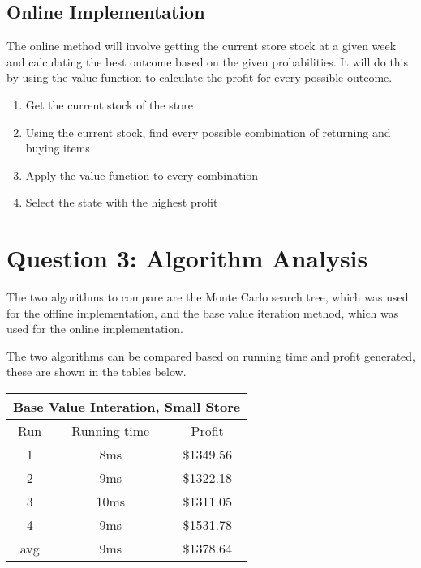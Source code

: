 \documentclass[12pt]{article}
\begin{document}
    \subsection{Online Implementation}

    The online method will involve getting the current store stock at a given week and calculating the best outcome based on the given probabilities. It will do this by using the value function to calculate the profit for every possible outcome.

    \begin{enumerate}
        \item Get the current stock of the store
        \item Using the current stock, find every possible combination of returning and buying items
        \item Apply the value function to every combination
        \item Select the state with the highest profit
    \end{enumerate}

    \section{Question 3: Algorithm Analysis}

    The two algorithms to compare are the Monte Carlo search tree, which was used for the offline implementation, and the base value iteration method, which was used for the online implementation.

    The two algorithms can be compared based on running time and profit generated, these are shown in the tables below.

    \begin{center}
        \begin{tabular}{ |c|c|c| }
            \hline
            \multicolumn{3}{|c|}{Base Value Interation, Small Store} \\
            \hline
            Run & Running time & Profit \\
            \hline
            1 & 8ms & \$1349.56\\
            2 & 9ms & \$1322.18\\
            3 & 10ms & \$1311.05\\
            4 & 9ms & \$1531.78\\
            \hline
            avg & 9ms & \$1378.64\\
            \hline
        \end{tabular}
    \end{center}
\end{document}
